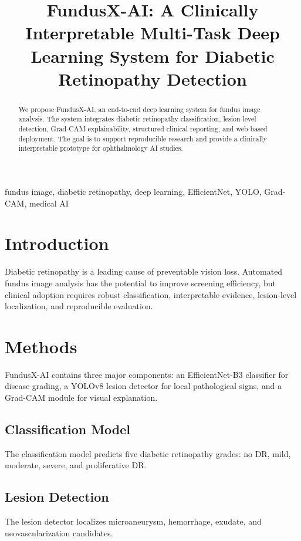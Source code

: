 \documentclass[conference]{IEEEtran}
\title{FundusX-AI: A Clinically Interpretable Multi-Task Deep Learning System for Diabetic Retinopathy Detection}
\author{\IEEEauthorblockN{Author Name}
\IEEEauthorblockA{Department of Ophthalmology / Artificial Intelligence Lab\\
Institution Name\\
Email: author@example.com}}
\begin{document}
\maketitle

\begin{abstract}
We propose FundusX-AI, an end-to-end deep learning system for fundus image analysis. The system integrates diabetic retinopathy classification, lesion-level detection, Grad-CAM explainability, structured clinical reporting, and web-based deployment. The goal is to support reproducible research and provide a clinically interpretable prototype for ophthalmology AI studies.
\end{abstract}

\begin{IEEEkeywords}
fundus image, diabetic retinopathy, deep learning, EfficientNet, YOLO, Grad-CAM, medical AI
\end{IEEEkeywords}

\section{Introduction}
Diabetic retinopathy is a leading cause of preventable vision loss. Automated fundus image analysis has the potential to improve screening efficiency, but clinical adoption requires robust classification, interpretable evidence, lesion-level localization, and reproducible evaluation.

\section{Methods}
FundusX-AI contains three major components: an EfficientNet-B3 classifier for disease grading, a YOLOv8 lesion detector for local pathological signs, and a Grad-CAM module for visual explanation.

\subsection{Classification Model}
The classification model predicts five diabetic retinopathy grades: no DR, mild, moderate, severe, and proliferative DR.

\subsection{Lesion Detection}
The lesion detector localizes microaneurysm, hemorrhage, exudate, and neovascularization candidates.
\end{document}
